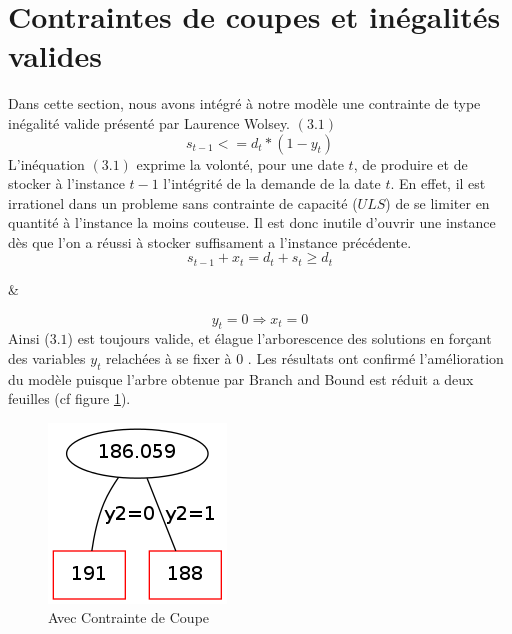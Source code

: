\documentclass[a4paper,11pt,twoside]{report}
\begin{document}
\section{Contraintes de coupes et inégalités valides}
Dans cette section, nous avons intégré à notre modèle une contrainte de type inégalité valide présenté par Laurence Wolsey. $(3.1)$
\begin{equation}
s_{t-1} <= d_{t}*(1-y_{t})
\end{equation}
L'inéquation $(3.1)$ exprime la volonté, pour une date $t$, de produire et de stocker à l'instance $t-1$ l'intégrité de la demande de la date $t$.
En effet, il est irrationel dans un probleme sans contrainte de capacité ($ULS$) de se limiter en quantité à l'instance la moins couteuse.
Il est donc inutile d'ouvrir une instance dès que l'on a réussi à stocker suffisament a l'instance précédente.
\begin{equation}
s_{t-1}+x_{t} = d_{t}+s_{t} \geq d_{t}
\end{equation}
\begin{center}\&\end{center}
\begin{equation}
y_{t}=0 \Rightarrow x_{t}=0
\end{equation}
Ainsi ($3.1$) est toujours valide, et élague l'arborescence des solutions en forçant des variables $y_{t}$ relachées à se fixer à 0 .
Les résultats ont confirmé l'amélioration du modèle puisque l'arbre obtenue par Branch and Bound est réduit a deux feuilles (cf figure \ref{graph3}).
\begin{figure}[h]
 \centering
 \includegraphics[width=\textwidth/4]{graph3.png}
 \caption{Avec Contrainte de Coupe}
 \label{graph3}
\end{figure}
\end{document}
